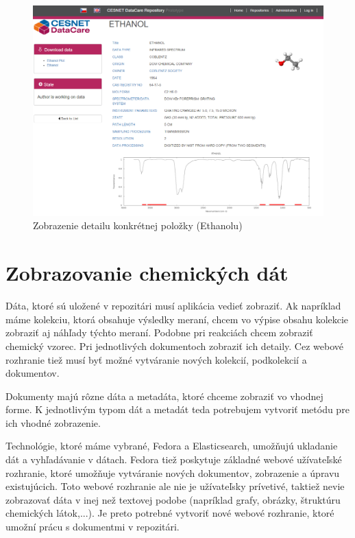 \documentclass[thesis=M,slovak]{FITthesis}[2013/05/06]
\begin{document}
\begin{figure}\centering
	\includegraphics[width=1.0\textwidth]{grafika/detail_Ethanol.png}
 	\caption[Zobrazenie detailu konkrétnej položky (Ethanolu)]{Zobrazenie detailu konkrétnej položky (Ethanolu)}\label{graphics:Ethanol}
\end{figure}

\section{Zobrazovanie chemických dát}
Dáta, ktoré sú uložené v repozitári musí aplikácia vedieť zobraziť. Ak napríklad máme kolekciu, ktorá obsahuje výsledky meraní, chcem vo výpise obsahu kolekcie zobraziť aj náhľady týchto meraní. Podobne pri reakciách chcem zobraziť chemický vzorec. Pri jednotlivých dokumentoch zobraziť ich detaily. Cez webové rozhranie tiež musí byť možné vytváranie nových kolekcií, podkolekcií a dokumentov.

Dokumenty majú rôzne dáta a metadáta, ktoré chceme zobraziť vo vhodnej forme. K jednotlivým typom dát a metadát teda potrebujem vytvoriť metódu pre ich vhodné zobrazenie.

Technológie, ktoré máme vybrané, Fedora a Elasticsearch, umožňujú ukladanie dát a vyhľadávanie v dátach. Fedora tiež poskytuje základné webové užívateľské rozhranie, ktoré umožňuje vytváranie nových dokumentov, zobrazenie a úpravu existujúcich. Toto webové rozhranie ale nie je užívateľsky prívetivé, taktiež nevie zobrazovať dáta v inej než textovej podobe (napríklad grafy, obrázky, štruktúru chemických látok,...). Je preto potrebné vytvoriť nové webové rozhranie, ktoré umožní prácu s dokumentmi v repozitári.
\end{document}
